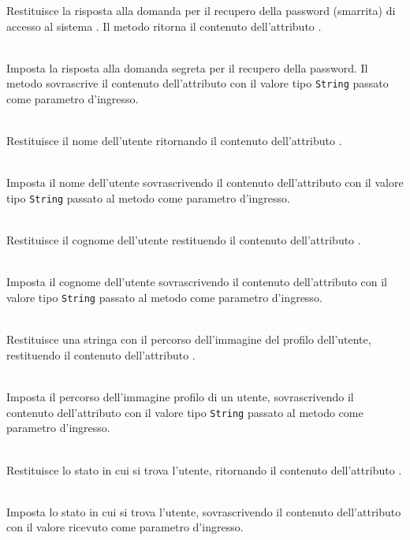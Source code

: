 \begin{description}
	Restituisce la risposta alla domanda per il recupero della password (smarrita) di accesso al sistema \caName. Il metodo ritorna il contenuto dell'attributo .
	\item{}\\
	Imposta la risposta alla domanda segreta per il recupero della password. Il metodo sovrascrive il contenuto dell'attributo  con il valore tipo \texttt{String} passato come parametro d'ingresso.
	\item{}\\
	Restituisce il nome dell'utente ritornando il contenuto dell'attributo .
	\item{}\\
	Imposta il nome dell'utente sovrascrivendo il contenuto dell'attributo  con il valore tipo \texttt{String} passato al metodo come parametro d'ingresso.
	\item{}\\
	Restituisce il cognome dell'utente restituendo il contenuto dell'attributo .
	\item{}\\
	Imposta il cognome dell'utente sovrascrivendo il contenuto dell'attributo  con il valore tipo \texttt{String} passato al metodo come parametro d'ingresso.
	\item{}\\
	Restituisce una stringa con il percorso dell'immagine del profilo dell'utente, restituendo il contenuto dell'attributo .
	\item{}\\
	Imposta il percorso dell'immagine profilo di un utente, sovrascrivendo il contenuto dell'attributo  con il valore tipo \texttt{String} passato al metodo come parametro d'ingresso.
	\item{}\\
	Restituisce lo stato in cui si trova l'utente, ritornando il contenuto dell'attributo .
	\item{}\\
	Imposta lo stato in cui si trova l'utente, sovrascrivendo il contenuto dell'attributo  con il valore ricevuto come parametro d'ingresso.

\end{description}
